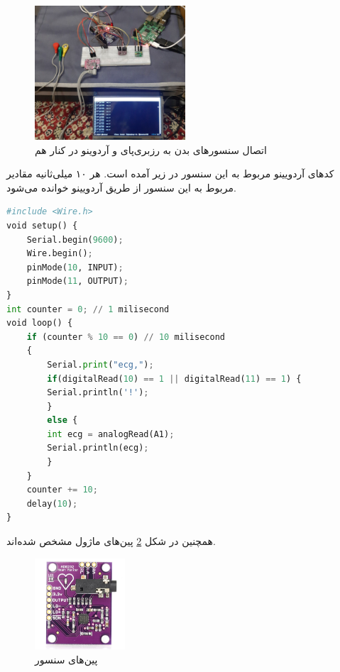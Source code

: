 \begin{figure}[h]
	\centering
	\includegraphics[width=0.5\textwidth]{figs/allbody.jpg}
	
	\caption{اتصال سنسورهای بدن به رزبری‌پای و آردوینو در کنار هم}
	\label{fig:7}
\end{figure}


کدهای آردویینو مربوط به این سنسور در زیر آمده است. هر ۱۰ میلی‌ثانیه مقادیر مربوط به این سنسور از طریق آردویینو خوانده می‌شود.

\begin{latin}
	\begin{lstlisting}[language=python]
#include <Wire.h>
void setup() {
	Serial.begin(9600);
	Wire.begin();
	pinMode(10, INPUT);
	pinMode(11, OUTPUT);
}
int counter = 0; // 1 milisecond
void loop() {
	if (counter % 10 == 0) // 10 milisecond
	{
		Serial.print("ecg,");
		if(digitalRead(10) == 1 || digitalRead(11) == 1) {
		Serial.println('!');
		}
		else {
		int ecg = analogRead(A1);
		Serial.println(ecg);
		}  
	}
	counter += 10;
	delay(10);
}

	\end{lstlisting}
\end{latin}


همچنین در شکل \ref{fig:17} پین‌های ماژول  مشخص شده‌اند.

\begin{figure}[h]
	\centering
	\includegraphics[width=0.3\textwidth]{figs/ad8232.jpg}
	
	\caption{پین‌های سنسور }
	\label{fig:17}
\end{figure}


